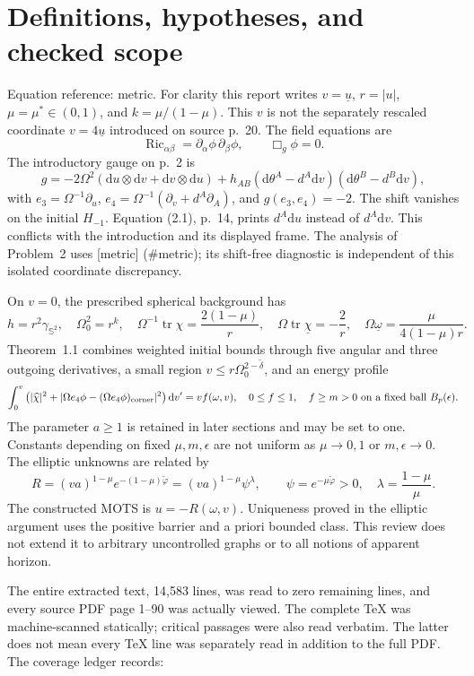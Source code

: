 \documentclass[10pt]{article}
\begin{document}
\section*{Definitions, hypotheses, and checked scope}
Equation reference: metric. For clarity this report writes \(v=\underline u\), \(r=|u|\), \(\mu=\mu^*\in(0,1)\), and \(k=\mu/(1-\mu)\). This \(v\) is not the separately rescaled coordinate \(v=4\underline u\) introduced on source p. 20. The field equations are \[\operatorname{Ric}_{\alpha\beta}=\partial_\alpha\phi\,\partial_\beta\phi,
 \qquad \Box_g\phi=0.\] The introductory gauge on p. 2 is \[
 g=-2\Omega^2(\mathrm du\otimes\mathrm dv+\mathrm dv\otimes\mathrm du)
 +h_{AB}(\mathrm d\theta^A-d^A\mathrm dv)(\mathrm d\theta^B-d^B\mathrm dv),\] with \(e_3=\Omega^{-1}\partial_u\), \(e_4=\Omega^{-1}(\partial_v+d^A\partial_A)\), and \(g(e_3,e_4)=-2\). The shift vanishes on the initial \(H_{-1}\). Equation (2.1), p. 14, prints \(d^A\mathrm du\) instead of \(d^A\mathrm dv\). This conflicts with the introduction and its displayed frame. The analysis of Problem 2 uses [metric] (\#metric); its shift-free diagnostic is independent of this isolated coordinate discrepancy.\par
On \(v=0\), the prescribed spherical background has \[h=r^2\gamma_{\mathbb S^2},\quad
 \Omega_0^2=r^k,\quad
 \Omega^{-1}\operatorname{tr}\chi=\frac{2(1-\mu)}r,\quad
 \Omega\operatorname{tr}\underline\chi=-\frac2r,\quad
 \Omega\underline\omega=\frac{\mu}{4(1-\mu)r}.\] Theorem 1.1 combines weighted initial bounds through five angular and three outgoing derivatives, a small region \(v\le r\Omega_0^{2-\widetilde\delta}\), and an energy profile \[\int_0^v\left(|\widehat\chi|^2+
     |\Omega e_4\phi-(\Omega e_4\phi)_{\mathrm{corner}}|^2\right)\mathrm dv'
 =vf(\omega,v),\quad 0\le f\le1,\quad f\ge m>0
 \ \hbox{on a fixed ball }B_p(\epsilon).\] The parameter \(a\ge1\) is retained in later sections and may be set to one. Constants depending on fixed \(\mu,m,\epsilon\) are not uniform as \(\mu\to0,1\) or \(m,\epsilon\to0\). The elliptic unknowns are related by \[R=(va)^{1-\mu}e^{-(1-\mu)\widetilde\varphi}
   =(va)^{1-\mu}\psi^\lambda,\qquad
 \psi=e^{-\mu\widetilde\varphi}>0,\quad
 \lambda=\frac{1-\mu}{\mu}.\] The constructed MOTS is \(u=-R(\omega,v)\). Uniqueness proved in the elliptic argument uses the positive barrier and a priori bounded class. This review does not extend it to arbitrary uncontrolled graphs or to all notions of apparent horizon.\par
The entire extracted text, 14,583 lines, was read to zero remaining lines, and every source PDF page 1–90 was actually viewed. The complete TeX was machine-scanned statically; critical passages were also read verbatim. The latter does not mean every TeX line was separately read in addition to the full PDF. The coverage ledger records:\par
\end{document}
